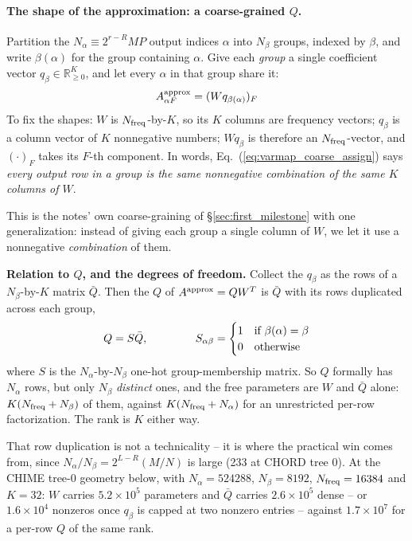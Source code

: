 \documentclass{article}
\numberwithin{equation}{section}   %
\begin{document}
\paragraph*{The shape of the approximation: a coarse-grained $Q$.}
Partition the $N_\alpha \equiv 2^{r-R}MP$ output indices $\alpha$ into $N_\beta$ groups, indexed by
$\beta$, and write $\beta(\alpha)$ for the group containing $\alpha$. Give each {\em group} a
single coefficient vector $q_\beta \in \mathbb{R}^K_{\ge 0}$, and let every $\alpha$ in that
group share it:
\begin{equation}
A^{\rm approx}_{\alpha F} = (W q_{\beta(\alpha)})_F
\label{eq:varmap_coarse_assign}
\end{equation}
To fix the shapes: $W$ is $N_{\rm freq}$-by-$K$, so its $K$ columns are frequency vectors;
$q_\beta$ is a column vector of $K$ nonnegative numbers; $W q_\beta$ is
therefore an $N_{\rm freq}$-vector, and $(\cdot)_F$ takes its $F$-th component. In words,
Eq.\ (\ref{eq:varmap_coarse_assign}) says {\em every output row in a group is the same
nonnegative combination of the same $K$ columns of $W$}.

This is the notes' own coarse-graining of \S\ref{sec:first_milestone} with one generalization:
instead of giving each group a single column of $W$, we let it use a nonnegative
{\em combination} of them.

{\bf Relation to $Q$, and the degrees of freedom.} Collect the $q_\beta$ as the rows of a
$N_\beta$-by-$K$ matrix $\bar Q$. Then the $Q$ of $A^{\rm approx} = QW^T$ is $\bar Q$ with its rows
duplicated across each group,
\begin{equation}
Q = S \bar Q,
\hspace{1.5cm}
S_{\alpha\beta} = \begin{cases} 1 & \mbox{if $\beta(\alpha) = \beta$} \\ 0 & \mbox{otherwise}\end{cases}
\label{eq:varmap_qbar}
\end{equation}
where $S$ is the $N_\alpha$-by-$N_\beta$ one-hot group-membership matrix. So $Q$ formally has
$N_\alpha$ rows, but only $N_\beta$ {\em distinct} ones, and the free parameters are $W$ and
$\bar Q$ alone: $K(N_{\rm freq} + N_\beta)$ of them, against $K(N_{\rm freq} + N_\alpha)$ for an
unrestricted per-row factorization. The rank is $K$ either way.

That row duplication is not a technicality -- it is where the practical win comes from, since
$N_\alpha / N_\beta = 2^{L-R} (M/N)$ is large (233 at CHORD tree 0). At the CHIME tree-0 geometry
below, with $N_\alpha = 524288$, $N_\beta = 8192$, $N_{\rm freq} = 16384$ and $K = 32$: $W$ carries
$5.2\times10^5$ parameters and $\bar Q$ carries $2.6\times10^5$ dense -- or $1.6\times10^4$
nonzeros once $q_\beta$ is capped at two nonzero entries -- against $1.7\times10^7$ for a
per-row $Q$ of the same rank.
\end{document}
